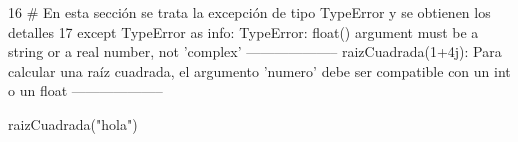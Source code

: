 \documentclass[
  spanish,
  letterpaper,
]{scrbook}
\newenvironment{Shaded}{\begin{snugshade}}{\end{snugshade}}
\newcommand{\NormalTok}[1]{\textcolor[rgb]{0.00,0.23,0.31}{#1}}
\newcommand{\StringTok}[1]{\textcolor[rgb]{0.13,0.47,0.30}{#1}}
\theoremstyle{definition}
\theoremstyle{remark}
\begin{document}
\begin{Highlighting}
\textcolor{QuartoInternalColor2}{}\textcolor{QuartoInternalColor4}{     16}\textcolor{QuartoInternalColor2}{ }\textcolor{QuartoInternalColor9}{# En esta sección se trata la excepción de tipo TypeError y se obtienen los detalles  }\textcolor{QuartoInternalColor2}{}
\textcolor{QuartoInternalColor2}{}\textcolor{QuartoInternalColor4}{     17}\textcolor{QuartoInternalColor2}{ }\textcolor{QuartoInternalColor5}{except}\textcolor{QuartoInternalColor2}{ }\textcolor{QuartoInternalColor12}{TypeError}\textcolor{QuartoInternalColor2}{ }\textcolor{QuartoInternalColor5}{as}\textcolor{QuartoInternalColor2}{ info:}
\textcolor{QuartoInternalColor2}{}\textcolor{QuartoInternalColor1}{TypeError}\textcolor{QuartoInternalColor2}{: float() argument must be a string or a real number, not 'complex'}
\textcolor{QuartoInternalColor2}{--------------------}
\textcolor{QuartoInternalColor2}{raizCuadrada(1+4j): Para calcular una raíz cuadrada, el argumento 'numero' debe ser compatible con un int o un float}
\textcolor{QuartoInternalColor2}{--------------------}
\end{Highlighting}

\begin{Shaded}
\begin{Highlighting}[]
\NormalTok{raizCuadrada(}\StringTok{"hola"}\NormalTok{)}
\end{Highlighting}
\end{Shaded}
\end{document}
